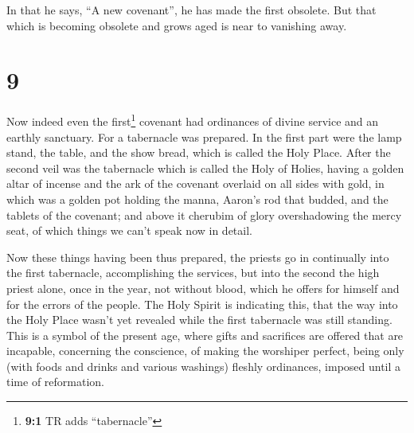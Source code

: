 In that he says, ``A new covenant'', he has made the
first obsolete. But that which is becoming obsolete and grows aged is
near to vanishing away.

\hypertarget{section-8}{%
\section{9}\label{section-8}}

 Now indeed even the first\footnote{\textbf{9:1} TR adds
  ``tabernacle''} covenant had ordinances of divine service and an
earthly sanctuary.  For a tabernacle was prepared. In the
first part were the lamp stand, the table, and the show bread, which is
called the Holy Place.  After the second veil was the
tabernacle which is called the Holy of Holies,  having a
golden altar of incense and the ark of the covenant overlaid on all
sides with gold, in which was a golden pot holding the manna, Aaron's
rod that budded, and the tablets of the covenant;  and
above it cherubim of glory overshadowing the mercy seat, of which things
we can't speak now in detail.

 Now these things having been thus prepared, the priests
go in continually into the first tabernacle, accomplishing the services,
 but into the second the high priest alone, once in the
year, not without blood, which he offers for himself and for the errors
of the people.  The Holy Spirit is indicating this, that
the way into the Holy Place wasn't yet revealed while the first
tabernacle was still standing.  This is a symbol of the
present age, where gifts and sacrifices are offered that are incapable,
concerning the conscience, of making the worshiper perfect,
 being only (with foods and drinks and various washings)
fleshly ordinances, imposed until a time of reformation.

